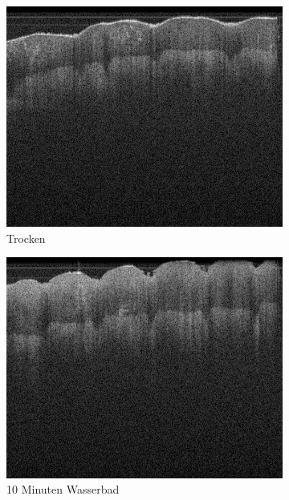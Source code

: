 \documentclass[german, %
parskip=full, %
bibliography=totoc, %
]{scrartcl}
\begin{document}
\begin{figure}[ht]
	\centering
	\begin{subfigure}[b]{0.3\textwidth}
	   \includegraphics[width=\textwidth]{finger_uncreme_1}
		 \caption{Trocken}
	\end{subfigure}
	\begin{subfigure}[b]{0.3\textwidth}
	   \includegraphics[width=\textwidth]{finger_uncreme_2}
		 \caption{10 Minuten Wasserbad}
	\end{subfigure}
	\begin{subfigure}[b]{0.3\textwidth}

\end{subfigure}
\end{figure}
\end{document}

